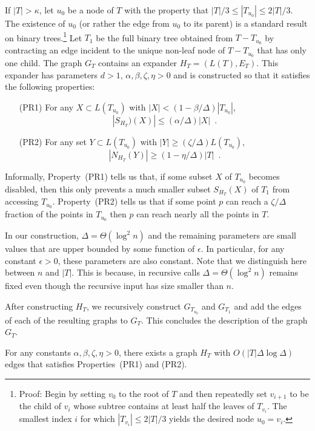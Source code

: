 \documentclass{patmorin}
\begin{document}
If $|T|>\kappa$, let $u_0$ be a node of $T$ with the property that
$|T|/3\le |T_{u_0}|\le 2|T|/3$.  The existence of $u_0$ (or rather
the edge from $u_0$ to its parent) is a standard result on binary
trees.\footnote{Proof: Begin by setting $v_0$ to the root of $T$ and then repeatedly set $v_{i+1}$ to be the child of $v_i$ whose subtree contains at least half the leaves of $T_{v_i}$.  The smallest index $i$ for which $|T_{v_i}|\le 2|T|/3$ yields the desired node $u_0=v_i$.}   Let $T_1$ be the full binary tree obtained from
$T-T_{u_0}$ by contracting an edge incident to the unique non-leaf node
of $T-T_{u_0}$ that has only one child.  The graph $G_{T}$ contains
an expander $H_T=(L(T),E_T)$. This expander has parameters $d>1$,
$\alpha, \beta,\zeta,\eta > 0$ and is constructed so that it satisfies
the following properties:
\begin{enumerate}
  \item[(PR1)] For any $X\subset L(T_{u_0})$ with
    $|X|<(1-\beta/\Delta)|T_{u_0}|$, 
    \[ |S_{H_T})(X)|\le (\alpha/\Delta)|X| \enspace . \]

  \item[(PR2)] For any set $Y\subset L(T_{u_0})$ with $|Y|\ge
    (\zeta/\Delta)L(T_{u_0})$, \[ |N_{H_T}(Y)|\ge (1-\eta/\Delta)|T| \enspace .\]
\end{enumerate}
Informally, Property~(PR1) tells us that, if some subset $X$
of $T_{u_0}$ becomes disabled, then this only prevents a much smaller
subset $S_{H_T}(X)$ of $T_{1}$ from accessing $T_{u_0}$.  Property~(PR2)
tells us that if some point $p$ can reach a $\zeta/\Delta$ fraction of
the points in $T_{u_0}$ then $p$ can reach nearly
all the points in $T$.

In our construction, $\Delta=\Theta(\log^2 n)$ and the remaining
parameters are small values that are upper bounded by some function
of $\epsilon$. In particular, for any constant $\epsilon >0$, these
parameters are also constant. Note that we distinguish here between $n$
and $|T|$. This is because, in recursive calls $\Delta=\Theta(\log^2 n)$
remains fixed even though the recursive input has size smaller than $n$.

After constructing $H_T$, we recursively construct $G_{T_{u_0}}$
and $G_{T_1}$ and add the edges of each of the resulting graphs to
$G_{T}$. This concludes the description of the graph $G_T$.

\begin{clm}
  For any constants $\alpha,\beta,\zeta,\eta>0$, there exists a graph $H_T$ with
  $O(|T|\Delta\log\Delta)$ edges that satisfies Properties~(PR1) and (PR2).
\end{clm}
\end{document}
